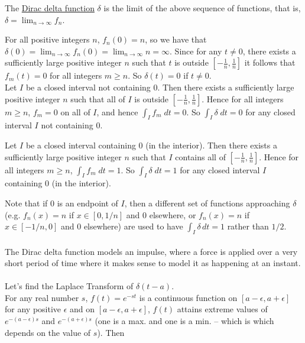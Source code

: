 \documentclass{ximera}
\begin{document}
 The \underline{Dirac delta function} $\delta$ is the limit of the above sequence of functions, that is, $\delta=\displaystyle \lim_{n\rightarrow \infty}f_{n}$. 

\newpage

 For all positive integers $n$, $f_{n}(0)=n$,  so we have that\\ $\displaystyle \delta (0)=\lim_{n\rightarrow \infty}f_{n}(0)=\lim_{n\rightarrow \infty}n=\infty$.  Since for any $t\neq 0$, there exists a sufficiently large positive integer $n$ such that $t$ is outside $\left[-\frac{1}{n},\frac{1}{n}\right]$ it follows that $f_m(t)=0$ for all integers $m\geq n$.  So $\delta (t)=0$ if $t\neq 0$.\\

Let $I$ be a closed interval not containing $0$.  Then there exists a sufficiently large positive integer $n$ such that all of $I$ is outside $\left[-\frac{1}{n},\frac{1}{n}\right]$.  Hence for all integers $m\geq n$, $f_m=0$ on all of $I$, and hence $\displaystyle \int_{I}f_{m}\;dt=0$.  So $\displaystyle \int_{I}\delta\;dt=0$ for any closed interval $I$ not containing $0$.

 Let $I$ be a closed interval containing $0$ (in the interior).  Then there exists a sufficiently large positive integer $n$ such that $I$ contains all of $\left[-\frac{1}{n},\frac{1}{n}\right]$.   Hence for all integers $m\geq n$, $\displaystyle \int_{I}f_{m}\;dt=1$.  So $\displaystyle \int_{I}\delta\;dt=1$ for any closed interval $I$ containing $0$ (in the interior).

Note that if $0$ is an endpoint of $I$, then a different set of functions approaching $\delta$ (e.g. $f_n(x)=n$ if $x\in [0,1/n]$ and $0$ elsewhere, or $f_n(x)=n$ if $x\in [-1/n,0]$ and $0$ elsewhere) are used to have $\displaystyle \int_I \delta\, dt=1$ rather than $1/2$.\\ \\

 The Dirac delta function models an impulse, where a force is applied over a very short period of time where it makes sense to model it as happening at an instant.\\ \\

Let's find the Laplace Transform of $\delta(t-a)$.\\


For any real number $s$, $f(t)=e^{-st}$ is a continuous function on $[a-\epsilon,a+\epsilon]$ for any positive $\epsilon$ and on $[a-\epsilon,a+\epsilon]$, $f(t)$ attains extreme values of $e^{-(a-\epsilon)s}$ and $e^{-(a+\epsilon)s}$  (one is a max. and one is a min. -- which is which depends on the value of $s$).  Then
\end{document}
